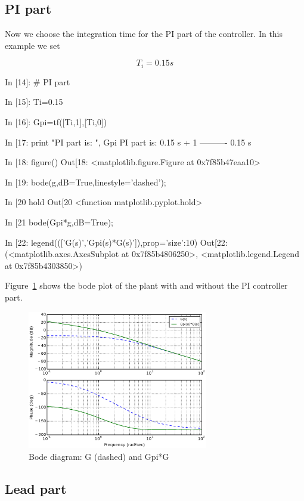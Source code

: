 \subsection{PI part}

Now we choose the integration time for the PI part of the controller. In this 
example we set

$$
T_i=0.15s
$$

\begin{code}
In [14]: # PI part

In [15]: Ti=0.15

In [16]: Gpi=tf([Ti,1],[Ti,0])

In [17: print "PI part is: ", Gpi
PI part is:  
0.15 s + 1
----------
  0.15 s


In [18: figure()
Out[18: <matplotlib.figure.Figure at 0x7f85b47eaa10>

In [19: bode(g,dB=True,linestyle='dashed');

In [20 hold
Out[20 <function matplotlib.pyplot.hold>

In [21 bode(Gpi*g,dB=True);

In [22: legend((['G(s)','Gpi(s)*G(s)']),prop={'size':10})
Out[22: 
(<matplotlib.axes.AxesSubplot at 0x7f85b4806250>,
 <matplotlib.legend.Legend at 0x7f85b4303850>)
\end{code}

Figure~\ref{F11} shows the bode plot of the plant with and without the PI 
controller part.

\begin{figure}[htbp]	%
\centering
\includegraphics[width=0.7\textwidth]{eps/bodeplantpi.eps}
\caption{Bode diagram: G (dashed) and Gpi*G}
\label{F11}
\end{figure}

\subsection{Lead part}

